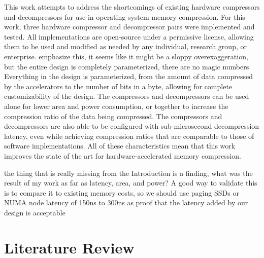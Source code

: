 \documentclass[doublespace,draft,nopageskip]{VTthesis} %
\begin{document}
This work attempts to address the shortcomings of existing hardware compressors and decompressors for use in operating system memory compression. For this work, three hardware compressor and decompressor pairs were implemented and tested. All implementations are open-source under a permissive license, allowing them to be used and modified as needed by any individual, research group, or enterprise. {\color{red} emphasize this, it seems like it might be a sloppy overexaggeration, but the entire design is completely parameterized, there are no magic numbers} Everything in the design is parameterized, from the amount of data compressed by the accelerators to the number of bits in a byte, allowing for complete customizability of the design. The compressors and decompressors can be used alone for lower area and power consumption, or together to increase the compression ratio of the data being compressed. The compressors and decompressors are also able to be configured with sub-microsecond decompression latency, even while achieving compression ratios that are comparable to those of software implementations. All of these characteristics mean that this work improves the state of the art for hardware-accelerated memory compression.

{\color{red} the thing that is really missing from the Introduction is a finding, what was the result of my work as far as latency, area, and power? A good way to validate this is to compare it to existing memory costs, so we should use paging SSDs or NUMA node latency of 150ns to 300ns as proof that the latency added by our design is acceptable}
	

\chapter{Literature Review} \label{ch:literature_review}
\end{document}

